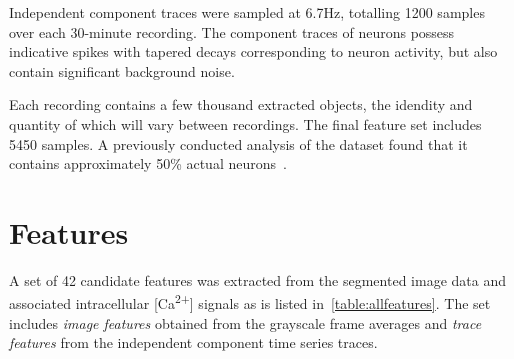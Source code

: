 \documentclass[10pt]{article}
\newcommand{\calcium}[0]{Ca\textsuperscript{2+}}
\begin{document}
Independent component traces were sampled at \num{6.7}\si{Hz}, totalling \num{1200} samples over each \num{30}-minute recording. The component traces of neurons possess indicative spikes with tapered decays corresponding to neuron activity, but also contain significant background noise.

Each recording contains a few thousand extracted objects, the idendity and quantity of which will vary between recordings.
The final feature set includes \num{5450} samples.
A previously conducted analysis of the dataset found that it contains approximately 50\% actual neurons~\cite{Kim2011}.

\section{Features}

A set of \num{42} candidate features was extracted from the segmented image data and associated intracellular [\calcium] signals as is listed in~\cref{table:allfeatures}.
The set includes \emph{image features} obtained from the grayscale frame averages and \emph{trace features} from the independent component time series traces.
\end{document}

